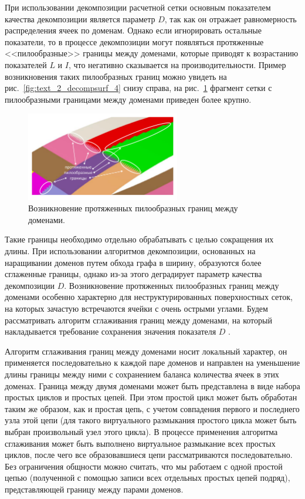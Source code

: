 При использовании декомпозиции расчетной сетки основным показателем качества декомпозиции является параметр $D$, так как он отражает равномерность распределения ячеек по доменам.
Однако если игнорировать остальные показатели, то в процессе декомпозиции могут появляться протяженные <<пилообразные>> границы между доменами, которые приводят к возрастанию показателей $L$ и $I$, что негативно сказывается на производительности.
Пример возникновения таких пилообразных границ можно увидеть на рис.~\ref{fig:text_2_decompsurf_4} снизу справа, на рис.~\ref{fig:text_2_smooth_bad_border} фрагмент сетки с пилообразными границами между доменами приведен более крупно.

\begin{figure}[ht]
\centering
\includegraphics[width=0.6\textwidth]{fig/par_bad-border.pdf}
\singlespacing
{}\caption{Возникновение протяженных пилообразных границ между доменами.}
\label{fig:text_2_smooth_bad_border}
\end{figure}

Такие границы необходимо отдельно обрабатывать с целью сокращения их длины.
При использовании алгоритмов декомпозиции, основанных на наращивании доменов путем обхода графа в ширину, образуются более сглаженные границы, однако из-за этого деградирует параметр качества декомпозиции $D$.
Возникновение протяженных пилообразных границ между доменами особенно характерно для неструктурированных поверхностных сеток, на которых зачастую встречаются ячейки с очень острыми углами.
Будем рассматривать алгоритм сглаживания границ между доменами, на который накладывается требование сохранения значения показателя $D$ \cite{Bagrov2021Smooth}.

Алгоритм сглаживания границ между доменами носит локальный характер, он применяется последовательно к каждой паре доменов и направлен на уменьшение длины границы между ними с сохранением баланса количества ячеек в этих доменах.
Граница между двумя доменами может быть представлена в виде набора простых циклов и простых цепей.
При этом простой цикл может быть обработан таким же образом, как и простая цепь, с учетом совпадения первого и последнего узла этой цепи (для такого виртуального размыкания простого цикла может быть выбран произвольный узел этого цикла).
В процессе применения алгоритма сглаживания может быть выполнено виртуальное размыкание всех простых циклов, после чего все образовавшиеся цепи рассматриваются последовательно.
Без ограничения общности можно считать, что мы работаем с одной простой цепью (полученной с помощью записи всех отдельных простых цепей подряд), представляющей границу между парами доменов.

